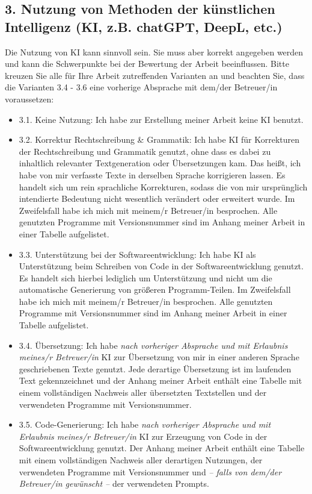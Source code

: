 {        \subsection*{3. Nutzung von Methoden der künstlichen Intelligenz (KI, z.B. chatGPT, DeepL, etc.)}
        Die Nutzung von KI kann sinnvoll sein. Sie muss aber korrekt angegeben werden und kann die Schwerpunkte bei der Bewertung der Arbeit beeinflussen. Bitte kreuzen Sie alle für Ihre Arbeit zutreffenden Varianten an und beachten Sie, dass die Varianten 3.4 - 3.6 eine vorherige Absprache mit dem/der Betreuer/in voraussetzen:
        \begin{itemize}
            \item[$\square$] 3.1. Keine Nutzung: Ich habe zur Erstellung meiner Arbeit keine KI benutzt.
            \item[$\square$] 3.2. Korrektur Rechtschreibung \& Grammatik: Ich habe KI für Korrekturen der Rechtschreibung und Grammatik genutzt, ohne dass es dabei zu inhaltlich relevanter Textgeneration oder Übersetzungen kam. Das heißt, ich habe von mir verfasste Texte in derselben Sprache korrigieren lassen. Es handelt sich um rein sprachliche Korrekturen, sodass die von mir ursprünglich intendierte Bedeutung nicht wesentlich verändert oder erweitert wurde. Im Zweifelsfall habe ich mich mit meinem/r Betreuer/in besprochen. Alle genutzten Programme mit Versionsnummer sind im Anhang meiner Arbeit in einer Tabelle aufgelistet.
            \item[$\square$] 3.3. Unterstützung bei der Softwareentwicklung: Ich habe KI als Unterstützung beim Schreiben von Code in der Softwareentwicklung genutzt. Es handelt sich hierbei lediglich um Unterstützung und nicht um die automatische Generierung von größeren Programm-Teilen. Im Zweifelsfall habe ich mich mit meinem/r Betreuer/in besprochen. Alle genutzten Programme mit Versionsnummer sind im Anhang meiner Arbeit in einer Tabelle aufgelistet.
            \item[$\square$] 3.4. Übersetzung: Ich habe \textit{nach vorheriger Absprache und mit Erlaubnis meines/r Betreuer/in} KI zur Übersetzung von mir in einer anderen Sprache geschriebenen Texte genutzt. Jede derartige Übersetzung ist im laufenden Text gekennzeichnet und der Anhang meiner Arbeit enthält eine Tabelle mit einem vollständigen Nachweis aller übersetzten Textstellen und der verwendeten Programme mit Versionsnummer.
            \item[$\square$] 3.5. Code-Generierung: Ich habe \textit{nach vorheriger Absprache und mit Erlaubnis meines/r Betreuer/in} KI zur Erzeugung von Code in der Softwareentwicklung genutzt. Der Anhang meiner Arbeit enthält eine Tabelle mit einem vollständigen Nachweis aller derartigen Nutzungen, der verwendeten Programme mit Versionsnummer und \textit{-- falls von dem/der Betreuer/in gewünscht --} der verwendeten Prompts.

\end{itemize}}
